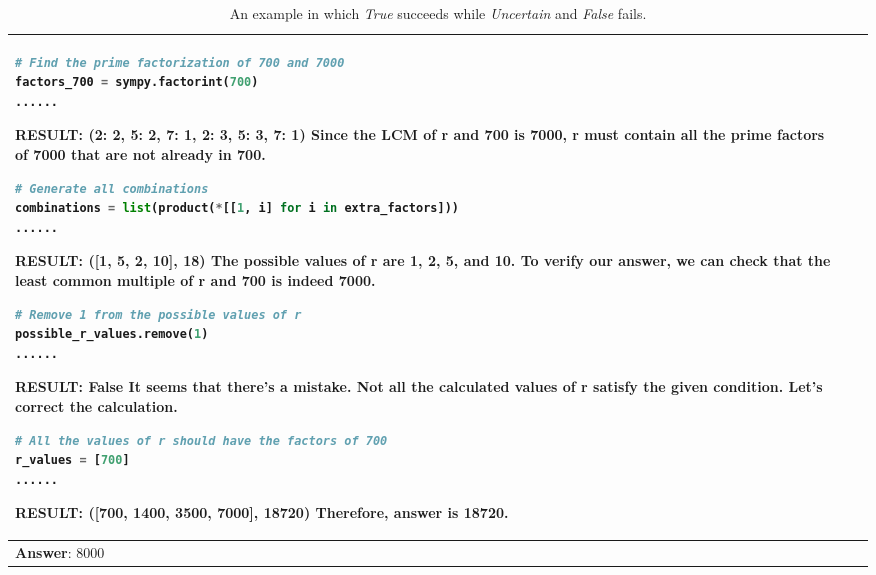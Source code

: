 \documentclass{article} \usepackage{iclr2023_conference,times}
\begin{document}
\begin{table*}[ht]
\begin{tabular}{p{}|p{}|p{}}
\begin{lstlisting}[language=Python]
# Find the prime factorization of 700 and 7000
factors_700 = sympy.factorint(700)
......
     \end{lstlisting} 
    \textbf{RESULT:}\newline
    \textbf{({2: 2, 5: 2, 7: 1}, {2: 3, 5: 3, 7: 1})}\newline
    Since the LCM of r and 700 is 7000, r must contain all the prime factors of 7000 that are not already in 700.
          \lstset{style=mystyle}
     \begin{lstlisting}[language=Python]
# Generate all combinations
combinations = list(product(*[[1, i] for i in extra_factors]))
......
     \end{lstlisting} 
    \textbf{RESULT:}\newline
    \textbf{([1, 5, 2, 10], 18)}\newline
    The possible values of r are 1, 2, 5, and 10. \newline
    To verify our answer, we can check that the least common multiple of r and 700 is indeed 7000.
    \lstset{style=mystyle}
     \begin{lstlisting}[language=Python]
# Remove 1 from the possible values of r
possible_r_values.remove(1)
......
     \end{lstlisting} 
    \textbf{RESULT:}\newline
    \textbf{False}\newline
    It seems that there's a mistake. Not all the calculated values of r satisfy the given condition. \newline
    Let's correct the calculation.
    \lstset{style=mystyle}
     \begin{lstlisting}[language=Python]
# All the values of r should have the factors of 700
r_values = [700]
......
     \end{lstlisting} 
    \textbf{RESULT:}\newline
    \textbf{([700, 1400, 3500, 7000], 18720)}\newline
    Therefore, answer is 18720.
     \\
     \midrule

      \multicolumn{3}{p{0.90\textwidth}}{\small \textbf{Answer}: 8000}
\\
     \bottomrule
    \end{tabular}
    \caption{An example in which \textit{True} succeeds while \textit{Uncertain} and \textit{False} fails.}
    \label{tab:verify_example1}
\end{table*}
\end{document}
